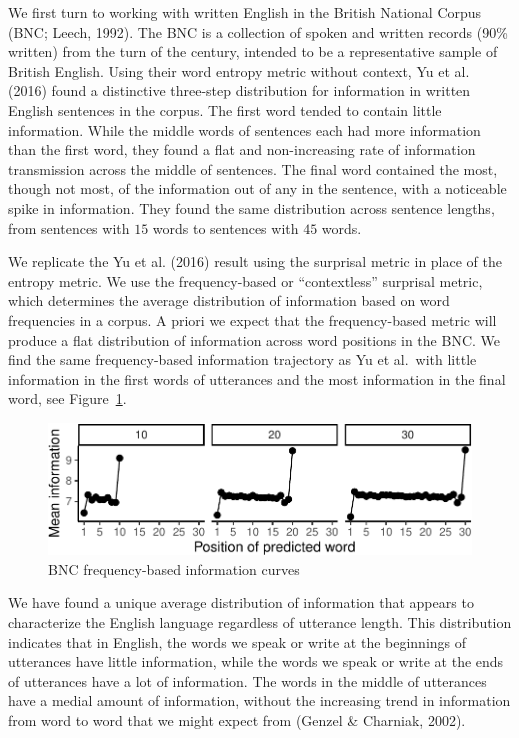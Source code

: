 \documentclass[man,floatsintext]{apa6}
\begin{document}
We first turn to working with written English in the British National Corpus (BNC; Leech, 1992). The BNC is a collection of spoken and written records (90\% written) from the turn of the century, intended to be a representative sample of British English. Using their word entropy metric without context, Yu et al. (2016) found a distinctive three-step distribution for information in written English sentences in the corpus. The first word tended to contain little information. While the middle words of sentences each had more information than the first word, they found a flat and non-increasing rate of information transmission across the middle of sentences. The final word contained the most, though not most, of the information out of any in the sentence, with a noticeable spike in information. They found the same distribution across sentence lengths, from sentences with \(15\) words to sentences with \(45\) words.

We replicate the Yu et al. (2016) result using the surprisal metric in place of the entropy metric. We use the frequency-based or \enquote{contextless} surprisal metric, which determines the average distribution of information based on word frequencies in a corpus. A priori we expect that the frequency-based metric will produce a flat distribution of information across word positions in the BNC. We find the same frequency-based information trajectory as Yu et al.~with little information in the first words of utterances and the most information in the final word, see Figure~\ref{fig:bnc-unigrams}.

\begin{figure}
\centering
\includegraphics{figs/bnc-unigrams-1.pdf}
\caption{\label{fig:bnc-unigrams}BNC frequency-based information curves}
\end{figure}

We have found a unique average distribution of information that appears to characterize the English language regardless of utterance length. This distribution indicates that in English, the words we speak or write at the beginnings of utterances have little information, while the words we speak or write at the ends of utterances have a lot of information. The words in the middle of utterances have a medial amount of information, without the increasing trend in information from word to word that we might expect from (Genzel \& Charniak, 2002).
\end{document}
